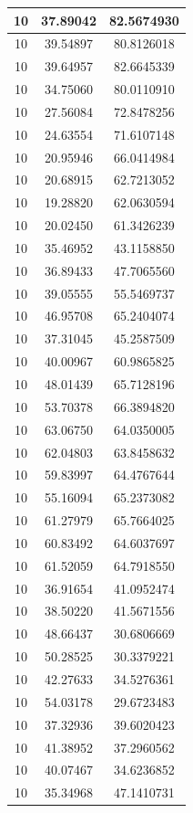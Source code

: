 \documentclass[
]{book}
\begin{document}
\begin{tabular}{c|c|c}
\hline
10 & 37.89042 & 82.5674930\\
\hline
10 & 39.54897 & 80.8126018\\
\hline
10 & 39.64957 & 82.6645339\\
\hline
10 & 34.75060 & 80.0110910\\
\hline
10 & 27.56084 & 72.8478256\\
\hline
10 & 24.63554 & 71.6107148\\
\hline
10 & 20.95946 & 66.0414984\\
\hline
10 & 20.68915 & 62.7213052\\
\hline
10 & 19.28820 & 62.0630594\\
\hline
10 & 20.02450 & 61.3426239\\
\hline
10 & 35.46952 & 43.1158850\\
\hline
10 & 36.89433 & 47.7065560\\
\hline
10 & 39.05555 & 55.5469737\\
\hline
10 & 46.95708 & 65.2404074\\
\hline
10 & 37.31045 & 45.2587509\\
\hline
10 & 40.00967 & 60.9865825\\
\hline
10 & 48.01439 & 65.7128196\\
\hline
10 & 53.70378 & 66.3894820\\
\hline
10 & 63.06750 & 64.0350005\\
\hline
10 & 62.04803 & 63.8458632\\
\hline
10 & 59.83997 & 64.4767644\\
\hline
10 & 55.16094 & 65.2373082\\
\hline
10 & 61.27979 & 65.7664025\\
\hline
10 & 60.83492 & 64.6037697\\
\hline
10 & 61.52059 & 64.7918550\\
\hline
10 & 36.91654 & 41.0952474\\
\hline
10 & 38.50220 & 41.5671556\\
\hline
10 & 48.66437 & 30.6806669\\
\hline
10 & 50.28525 & 30.3379221\\
\hline
10 & 42.27633 & 34.5276361\\
\hline
10 & 54.03178 & 29.6723483\\
\hline
10 & 37.32936 & 39.6020423\\
\hline
10 & 41.38952 & 37.2960562\\
\hline
10 & 40.07467 & 34.6236852\\
\hline
10 & 35.34968 & 47.1410731\\

\end{tabular}
\end{document}
